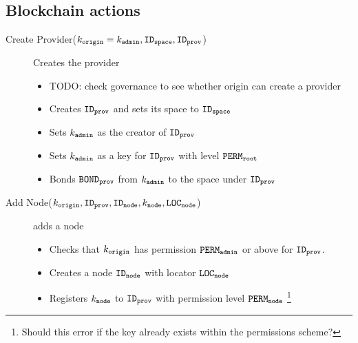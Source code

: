 \documentclass{article}
\begin{document}
\subsection{Blockchain actions}
\begin{description}
  \item[Create Provider($k_\mathtt{origin} = k_\mathtt{admin}, \mathtt{ID_{space}}, \mathtt{ID_{prov}}$)] Creates the provider
    \begin{itemize}
      \item TODO: check governance to see whether origin can create a provider
      \item Creates $\mathtt{ID_{prov}}$ and sets its space to $\mathtt{ID_{space}}$
      \item Sets $k_\mathtt{admin}$ as the creator of $\mathtt{ID_{prov}}$
      \item Sets $k_\mathtt{admin}$ as a key for $\mathtt{ID_{prov}}$ with level $\mathtt{PERM_{root}}$
      \item Bonds $\mathtt{BOND_{prov}}$ from $k_\mathtt{admin}$ to the space under $\mathtt{ID_{prov}}$
    \end{itemize}
  \item[Add Node($k_\mathtt{origin}, \mathtt{ID_{prov}}, \mathtt{ID_{node}}, k_\mathtt{node}, \mathtt{LOC_{node}}$)] adds a node
    \begin{itemize}
      \item Checks that $k_\mathtt{origin}$ has permission $\mathtt{PERM_{admin}}$ or above for $\mathtt{ID_{prov}}$.
      \item Creates a node $\mathtt{ID_{node}}$ with locator $\mathtt{LOC_{node}}$
      \item Registers $k_\mathtt{node}$ to $\mathtt{ID_{prov}}$ with permission level $\mathtt{PERM_{node}}$ \footnote{Should this error if the key already exists within the permissions scheme?}
    \end{itemize}
\end{description}
\end{document}

